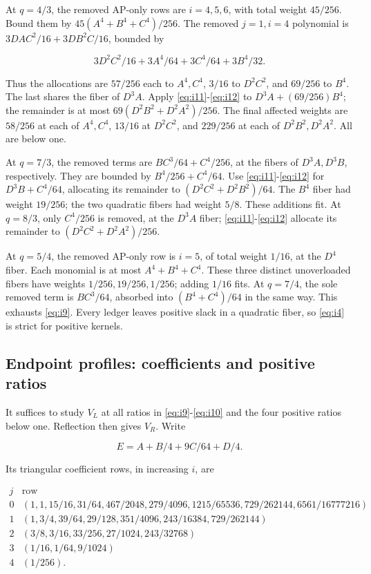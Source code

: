 At \(q=4/3\), the removed AP-only rows are \(i=4,5,6\), with total
weight \(45/256\). Bound them by
\(45(A^4+B^4+C^4)/256\). The removed \(j=1,i=4\) polynomial is
\(3DAC^2/16+3DB^2C/16\), bounded by

\[
3D^2C^2/16+3A^4/64+3C^4/64+3B^4/32.
\]

Thus the allocations are \(57/256\) each to \(A^4,C^4\), \(3/16\) to
\(D^2C^2\), and \(69/256\) to \(B^4\). The last shares the fiber of
\(D^3A\). Apply \eqref{eq:i11}-\eqref{eq:i12} to
\(D^3A+(69/256)B^4\); the remainder is at most
\(69(D^2B^2+D^2A^2)/256\). The final affected weights are
\(58/256\) at each of \(A^4,C^4\), \(13/16\) at \(D^2C^2\), and
\(229/256\) at each of \(D^2B^2,D^2A^2\). All are below one.

At \(q=7/3\), the removed terms are \(BC^3/64+C^4/256\), at the fibers
of \(D^3A,D^3B\), respectively. They are bounded by
\(B^4/256+C^4/64\). Use \eqref{eq:i11}-\eqref{eq:i12} for \(D^3B+C^4/64\), allocating its
remainder to \((D^2C^2+D^2B^2)/64\). The \(B^4\) fiber had weight
\(19/256\); the two quadratic fibers had weight \(5/8\). These additions
fit. At \(q=8/3\), only \(C^4/256\) is removed, at the \(D^3A\) fiber;
\eqref{eq:i11}-\eqref{eq:i12} allocate its remainder to \((D^2C^2+D^2A^2)/256\).

At \(q=5/4\), the removed AP-only row is \(i=5\), of total weight
\(1/16\), at the \(D^4\) fiber. Each monomial is at most
\(A^4+B^4+C^4\). These three distinct unoverloaded fibers have weights
\(1/256,19/256,1/256\); adding \(1/16\) fits. At \(q=7/4\), the sole
removed term is \(BC^3/64\), absorbed into \((B^4+C^4)/64\) in the same
way. This exhausts \eqref{eq:i9}. Every ledger leaves positive slack in a quadratic
fiber, so \eqref{eq:i4} is strict for positive kernels.

\subsection{Endpoint profiles: coefficients and positive ratios}

It suffices to study \(V_L\) at all ratios in \eqref{eq:i9}-\eqref{eq:i10} and the four positive
ratios below one. Reflection then gives \(V_R\). Write

\[
E=A+B/4+9C/64+D/4.
\]

Its triangular coefficient rows, in increasing \(i\), are

\begin{equation}\label{eq:i14}
\begin{array}{c|l}
j&\text{row}\\\hline
0&(1,1,15/16,31/64,467/2048,279/4096,1215/65536,
729/262144,6561/16777216)\\
1&(1,3/4,39/64,29/128,351/4096,243/16384,729/262144)\\
2&(3/8,3/16,33/256,27/1024,243/32768)\\
3&(1/16,1/64,9/1024)\\
4&(1/256).
\end{array}
\end{equation}

